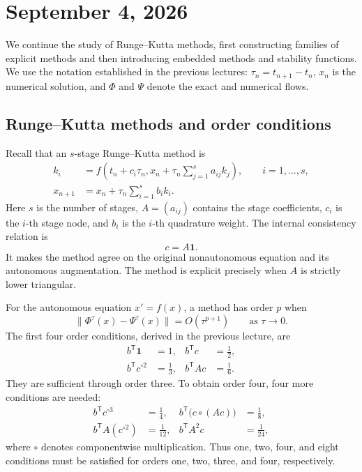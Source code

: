 \section{September 4, 2026}

We continue the study of Runge--Kutta methods, first constructing
families of explicit methods and then introducing embedded methods and
stability functions. We use the notation established in the previous
lectures: \(\tau_n=t_{n+1}-t_n\), \(x_n\) is the numerical solution,
and \(\Phi\) and \(\Psi\) denote the exact and numerical flows.

\subsection{Runge--Kutta methods and order conditions}

Recall that an \(s\)-stage Runge--Kutta method is
\begin{align*}
  k_i
  &=f\left(t_n+c_i\tau_n,
    x_n+\tau_n\sum_{j=1}^s a_{ij}k_j\right),
    \qquad i=1,\ldots,s,\\
  x_{n+1}
  &=x_n+\tau_n\sum_{i=1}^s b_i k_i.
\end{align*}
Here \(s\) is the number of stages, \(A=(a_{ij})\) contains the stage
coefficients, \(c_i\) is the \(i\)-th stage node, and \(b_i\) is the
\(i\)-th quadrature weight. The internal consistency relation is
\[
  c=A\mathbf{1}.
\]
It makes the method agree on the original nonautonomous equation and
its autonomous augmentation. The method is explicit precisely when
\(A\) is strictly lower triangular.

For the autonomous equation \(x'=f(x)\), a method has order \(p\) when
\[
  \bigl\lVert\Phi^\tau(x)-\Psi^\tau(x)\bigr\rVert
  =O(\tau^{p+1})
  \qquad\text{as }\tau\to0.
\]
The first four order conditions, derived in the previous lecture, are
\begin{align*}
  b^{\mathsf T}\mathbf{1}&=1,
  &b^{\mathsf T}c&=\frac12,\\
  b^{\mathsf T}c^{\circ2}&=\frac13,
  &b^{\mathsf T}Ac&=\frac16.
\end{align*}
They are sufficient through order three. To obtain order four, four
more conditions are needed:
\begin{align*}
  b^{\mathsf T}c^{\circ3}&=\frac14,
  &b^{\mathsf T}\bigl(c\circ(Ac)\bigr)&=\frac18,\\
  b^{\mathsf T}A(c^{\circ2})&=\frac1{12},
  &b^{\mathsf T}A^2c&=\frac1{24},
\end{align*}
where \(\circ\) denotes componentwise multiplication. Thus one, two,
four, and eight conditions must be satisfied for orders one, two,
three, and four, respectively.

